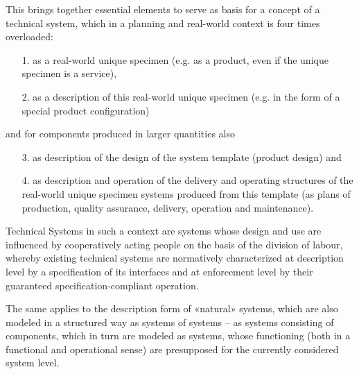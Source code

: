 \documentclass[11pt,a4paper]{article}
\begin{document}
This brings together essential elements to serve as basis for a concept of a
technical system, which in a planning and real-world context is four times
overloaded:
\begin{itemize}
\item[1.] as a real-world unique specimen (e.g. as a product, even if the
  unique specimen is a service),
\item[2.] as a description of this real-world unique specimen (e.g. in the
  form of a special product configuration)
\end{itemize}
and for components produced in larger quantities also
\begin{itemize}
\item[3.] as description of the design of the system template (product design)
  and
\item[4.] as description and operation of the delivery and operating
  structures of the real-world unique specimen systems produced from this
  template (as plans of production, quality assurance, delivery, operation and
  maintenance).
\end{itemize}
Technical Systems in such a context are systems whose design and use are
influenced by cooperatively acting people on the basis of the division of
labour, whereby existing technical systems are normatively characterized at
description level by a specification of its interfaces and at enforcement
level by their guaranteed specification-compliant operation.

The same applies to the description form of «natural» systems, which are also
modeled in a structured way as systems of systems – as systems consisting of
components, which in turn are modeled as systems, whose functioning (both in a
functional and operational sense) are presupposed for the currently considered
system level.
\end{document}
